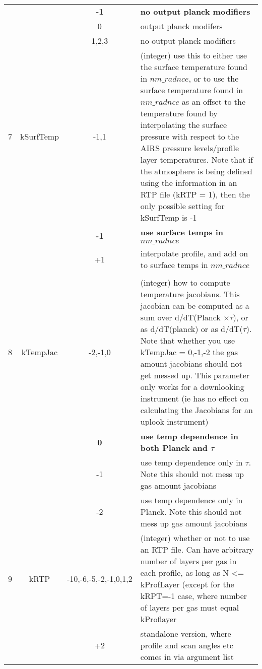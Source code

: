 \documentclass[12pt]{article}
\newlength{\colwidth}
\newlength{\colwidthshort}
\begin{document}
\begin{small}
\begin{longtable}{|c|c|c|p{\colwidthshort}|}
   &  & {\bf -1}    & {\bf no output planck modifiers} \\
   &  & 0           & output planck modifers\\
   &  & 1,2,3       & no output planck modifiers \\
\hline
7 & {\sf kSurfTemp}   & -1,1 & (integer) use this to either use the surface 
temperature found in $nm\_radnce$, or to use the surface temperature found in 
$nm\_radnce$ as an offset to the temperature found by interpolating the 
surface pressure with respect to the AIRS pressure levels/profile layer
temperatures. Note that if the atmosphere is being defined using the 
information in an RTP file (kRTP = 1), then the only possible setting for
kSurfTemp is -1\\ 
  &         & {\bf -1}   & {\bf use surface temps in $nm\_radnce$}\\
  &         & {+1}   & {interpolate profile, and add on to 
                                      surface temps in $nm\_radnce$}\\
\\ \hline
8 & {\sf kTempJac}   & -2,-1,0   & (integer) how to compute temperature 
jacobians. This jacobian can be computed as a sum over d/dT(Planck $\times 
\tau$), or as d/dT(planck) or as d/dT($\tau$). Note that whether
you use kTempJac = 0,-1,-2 the gas amount jacobians should not get messed 
up. This parameter only works for a downlooking instrument (ie has no effect on
calculating the Jacobians for an uplook instrument) \\
  &              & {\bf 0}  & {\bf use temp dependence in both Planck 
                               and $\tau$}\\
  &              & {-1}  & use temp dependence only in $\tau$. Note this
                              should not mess up gas amount jacobians \\
  &              & {-2}  & use temp dependence only in Planck. Note this
                              should not mess up gas amount jacobians \\ \hline
9 & {\sf kRTP}   & -10,-6,-5,-2,-1,0,1,2  & (integer) whether or not to use an RTP file. 
                                 Can have arbitrary number of layers per gas in
                                 each profile, as long as N <= kProfLayer 
                                 (except for the kRPT=-1 case, where number of
                                  layers per gas must equal kProflayer \\
  &              & {+2}      & standalone version, where profile and scan angles etc comes in via argument list \\

\end{longtable}
\end{small}
\end{document}
